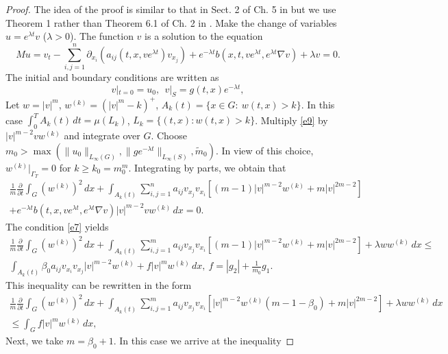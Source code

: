 \documentclass{article}
\theoremstyle{plain}
\begin{document}
\begin{proof} The idea of the proof is similar to that in Sect. 2 of Ch. 5 in \cite{lad} but we use Theorem 1 rather than Theorem 6.1 of Ch. 2 in \cite{lad}.   
Make the change of variables 
$u=e^{\lambda t}v$ ($\lambda >0$). The function  $v$ is a solution to the equation
\begin{equation}\label{e9}
	Mu= v_t-\sum_{i,j=1}^n \partial_{x_i}(a_{ij}(t,x,ve^{\lambda t})v_{x_j})+ e^{-\lambda t}b(x,t,ve^{\lambda t},e^{\lambda t}\nabla v)+\lambda v=0.
\end{equation}
The initial and boundary conditions are written as 
\begin{equation}\label{e10}
	v|_{t=0}=u_0,\ \ v|_{S}= g(t,x)e^{-\lambda t}, 
\end{equation}
Let  $w=|v|^m$, $w^{(k)}=(|v|^m-k)^+$, 
 $A_k(t)=\{x\in G:\  w(t,x)> k\}$. In this case  $\int_0^T A_k(t)\,dt=\mu(L_k)$, $L_k=\{(t,x): w(t,x)> k\}$.
Multiply  \eqref{e9} by   $|v|^{m-2} v w^{(k)}$ and integrate over  $G$. Choose  $m_0> \max(\|u_0\|_{L_\infty(G)},\|ge^{-\lambda t}\|_{L_\infty(S)}, \tilde{m}_0)$. 
In view of this choice,   $w^{(k)}|_{\Gamma_T}=0$ for $k\geq k_0=m_0^m$. 
Integrating by parts, we obtain that 
\begin{multline}\label{e11}
\frac{1}{m}\frac{\partial}{\partial t} \int_G (w^{(k)})^2\,dx +\int_{A_k(t)} 
\sum_{i,j=1}^n a_{ij}v_{x_j}v_{x_i} [(m-1)|v|^{m-2}w^{(k)}+ m|v|^{2m-2}] \\ + 
e^{-\lambda t}b(t,x,ve^{\lambda t},e^{\lambda t}\nabla v)|v|^{m-2} v w^{(k)}\,dx=0.
\end{multline}
The condition  \eqref{e7} yields 
\begin{multline*}
\frac{1}{m}\frac{\partial}{\partial t} \int_G (w^{(k)})^2\,dx +
\int_{A_k(t)} \sum_{i,j=1}^m a_{ij}v_{x_j}v_{x_i} [(m-1)|v|^{m-2}w^{(k)}+ m|v|^{2m-2}]+\lambda ww^{(k)}\,dx \leq  \\
\int_{A_k(t)} \beta_0a_{ij}v_{x_i}v_{x_j}|v|^{m-2}w^{(k)} + 
f|v|^{m}w^{(k)} \,dx, \  f=|g_2|+\frac{1}{m_0}g_1.
\end{multline*}
This inequality can be rewritten in the form 
\begin{multline*}
\frac{1}{m}\frac{\partial}{\partial t} \int_G (w^{(k)})^2\,dx +
\int_{A_k(t)} \sum_{i,j=1}^m a_{ij}v_{x_j}v_{x_i} [|v|^{m-2}w^{(k)}(m-1-\beta_0) + m|v|^{2m-2}]+\lambda ww^{(k)}\,dx \\ \leq 
\int_G f|v|^{m}w^{(k)} \,dx,\   
\end{multline*}
Next, we take  $m=\beta_0+1$.
In this case we arrive at the inequality 

\end{proof}
\end{document}
